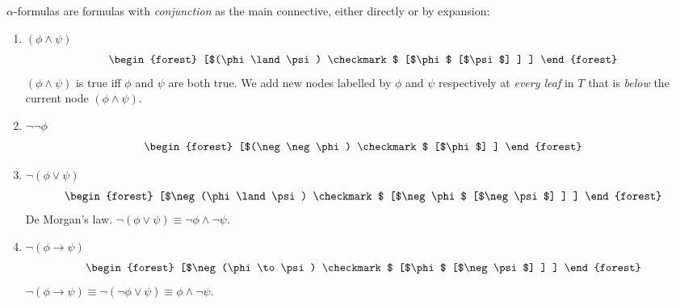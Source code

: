 \begin{definition}
    $\alpha$-formulas are formulas with \textit{conjunction} as the main
    connective, either directly or by expansion:
    
    \begin{enumerate}
        \item $(\phi \land \psi)$
            \begin{equation}
                \begin{forest}
                    [$(\phi \land \psi) \checkmark$
                        [$\phi$
                            [$\psi$]
                        ]
                    ]
                \end{forest}
            \end{equation}
            $(\phi \land \psi)$ is true iff $\phi$ and $\psi$ are both true.
            We add new nodes labelled by $\phi$ and $\psi$ respectively at
            \textit{every leaf} in $T$ that is \textit{below} the current node
            $(\phi \land \psi)$.
        \item $\neg \neg \phi$
            \begin{equation}
                \begin{forest}
                    [$(\neg \neg \phi) \checkmark$
                        [$\phi$]
                    ]
                \end{forest}
            \end{equation}
        \item $\neg (\phi \lor \psi)$
            \begin{equation}
                \begin{forest}
                    [$\neg (\phi \land \psi) \checkmark$
                        [$\neg \phi$
                            [$\neg \psi$]
                        ]
                    ]
                \end{forest}
            \end{equation}
            De Morgan's law. $\neg (\phi \lor \psi) \equiv 
            \neg \phi \land \neg \psi$.
        \item $\neg (\phi \to \psi)$
            \begin{equation}
                \begin{forest}
                    [$\neg (\phi \to \psi) \checkmark$
                        [$\phi$
                            [$\neg \psi$]
                        ]
                    ]
                \end{forest}
            \end{equation}
            $\neg (\phi \to \psi) 
                \equiv \neg (\neg \phi \lor \psi)
                \equiv \phi \land \neg \psi$.
    \end{enumerate}
\end{definition}

